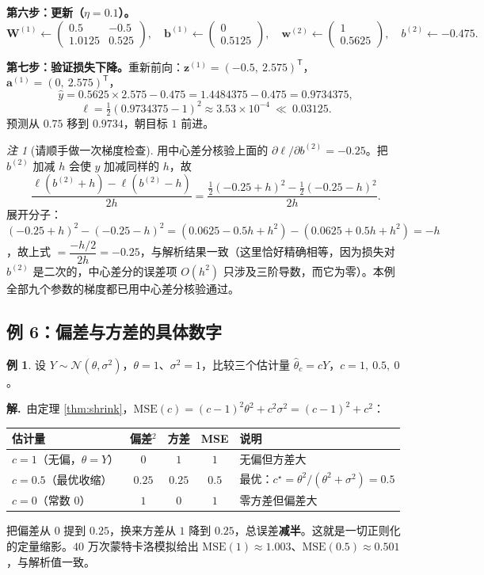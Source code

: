 \documentclass[UTF8,a4paper,11pt]{ctexart}
\theoremstyle{definition}
\newtheorem{example}[definition]{例}
\theoremstyle{plain}
\theoremstyle{remark}
\newtheorem{remark}[definition]{注}
\newcommand{\T}{^{\mathsf{T}}}
\begin{document}
\textbf{第六步：更新（$\eta=0.1$）。}
\[
  \bm{W}^{(1)}\leftarrow\begin{pmatrix}0.5&-0.5\\1.0125&0.525\end{pmatrix},\quad
  \bm{b}^{(1)}\leftarrow\begin{pmatrix}0\\0.5125\end{pmatrix},\quad
  \bm{w}^{(2)}\leftarrow\begin{pmatrix}1\\0.5625\end{pmatrix},\quad
  b^{(2)}\leftarrow-0.475 .
\]

\textbf{第七步：验证损失下降。}重新前向：$\bm{z}^{(1)}=(-0.5,\ 2.575)\T$，$\bm{a}^{(1)}=(0,\ 2.575)\T$，
\[
  \hat y=0.5625\times2.575-0.475=1.4484375-0.475=0.9734375,
\]
\[
  \ell=\tfrac12(0.9734375-1)^2\approx3.53\times10^{-4}\ \ll\ 0.03125 .
\]
预测从 $0.75$ 移到 $0.9734$，朝目标 $1$ 前进。

\begin{remark}[请顺手做一次梯度检查]
用中心差分核验上面的 $\partial\ell/\partial b^{(2)}=-0.25$。把 $b^{(2)}$ 加减 $h$ 会使 $\hat y$ 加减同样的 $h$，故
\[
  \frac{\ell(b^{(2)}+h)-\ell(b^{(2)}-h)}{2h}
  =\frac{\tfrac12(-0.25+h)^2-\tfrac12(-0.25-h)^2}{2h}.
\]
展开分子：$(-0.25+h)^2-(-0.25-h)^2=(0.0625-0.5h+h^2)-(0.0625+0.5h+h^2)=-h$，故上式 $=\dfrac{-h/2}{2h}=-0.25$，与解析结果一致（这里恰好精确相等，因为损失对 $b^{(2)}$ 是二次的，中心差分的误差项 $O(h^2)$ 只涉及三阶导数，而它为零）。本例全部九个参数的梯度都已用中心差分核验通过。
\end{remark}

\subsection{例 6：偏差与方差的具体数字}

\begin{example}\label{ex:bv}
设 $Y\sim\mathcal{N}(\theta,\sigma^2)$，$\theta=1$、$\sigma^2=1$，比较三个估计量 $\hat\theta_c=cY$，$c=1,\ 0.5,\ 0$。
\end{example}

\noindent\textbf{解.}\ 由定理 \ref{thm:shrink}，$\mathrm{MSE}(c)=(c-1)^2\theta^2+c^2\sigma^2=(c-1)^2+c^2$：
\begin{center}
\begin{tabular}{@{}lcccl@{}}
\toprule
估计量 & 偏差$^2$ & 方差 & MSE & 说明\\
\midrule
$c=1$（无偏，$\hat\theta=Y$） & $0$ & $1$ & $1$ & 无偏但方差大\\
$c=0.5$（最优收缩） & $0.25$ & $0.25$ & $\bm{0.5}$ & 最优：$c^\star=\theta^2/(\theta^2+\sigma^2)=0.5$\\
$c=0$（常数 $0$） & $1$ & $0$ & $1$ & 零方差但偏差大\\
\bottomrule
\end{tabular}
\end{center}
把偏差从 $0$ 提到 $0.25$，换来方差从 $1$ 降到 $0.25$，总误差\textbf{减半}。这就是一切正则化的定量缩影。$40$ 万次蒙特卡洛模拟给出 $\mathrm{MSE}(1)\approx1.003$、$\mathrm{MSE}(0.5)\approx0.501$，与解析值一致。
\end{document}
